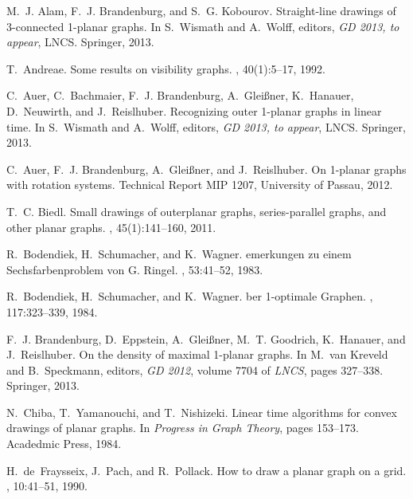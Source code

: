 \documentclass[runningheads]{llncs}
\begin{document}
\begin{thebibliography}{10}

M.~J. Alam, F.~J. Brandenburg, and S.~G. Kobourov.
\newblock Straight-line drawings of 3-connected 1-planar graphs.
\newblock In S.~Wismath and A.~Wolff, editors, {\em {GD} 2013, to appear},
  {LNCS}. Springer, 2013.

T.~Andreae.
\newblock Some results on visibility graphs.
, 40(1):5--17, 1992.

C.~Auer, C.~Bachmaier, F.~J. Brandenburg, A.~Glei\ss{}ner, K.~Hanauer,
  D.~Neuwirth, and J.~Reislhuber.
\newblock Recognizing outer 1-planar graphs in linear time.
\newblock In S.~Wismath and A.~Wolff, editors, {\em {GD} 2013, to appear},
  {LNCS}. Springer, 2013.

C.~Auer, F.~J. Brandenburg, A.~Glei{\ss}ner, and J.~Reislhuber.
\newblock On 1-planar graphs with rotation systems.
\newblock Technical Report MIP 1207, University of Passau, 2012.

T.~C. Biedl.
\newblock Small drawings of outerplanar graphs, series-parallel graphs, and
  other planar graphs.
, 45(1):141--160, 2011.

R.~Bodendiek, H.~Schumacher, and K.~Wagner.
emerkungen zu einem {S}echsfarbenproblem von {G}. {R}ingel.
, 53:41--52, 1983.

R.~Bodendiek, H.~Schumacher, and K.~Wagner.
ber 1-optimale {G}raphen.
, 117:323--339, 1984.

F.~J. Brandenburg, D.~Eppstein, A.~Glei{\ss}ner, M.~T. Goodrich, K.~Hanauer,
  and J.~Reislhuber.
\newblock On the density of maximal 1-planar graphs.
\newblock In M.~van Kreveld and B.~Speckmann, editors, {\em {GD} 2012}, volume
  7704 of {\em {LNCS}}, pages 327--338. Springer, 2013.

N.~Chiba, T.~Yamanouchi, and T.~Nishizeki.
\newblock Linear time algorithms for convex drawings of planar graphs.
\newblock In {\em {Progress in Graph Theory}}, pages 153--173. Acadedmic Press,
  1984.

H.~de~Fraysseix, J.~Pach, and R.~Pollack.
\newblock How to draw a planar graph on a grid.
, 10:41--51, 1990.


\end{thebibliography}
\end{document}
